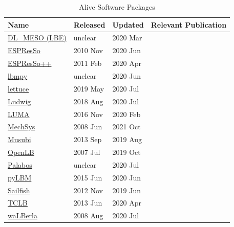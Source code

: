 \documentclass[final, 3p, times, authoryear]{elsarticle}
\begin{document}
\begin{table}
	\begin{center}
		\begin{tabular}{ p{3cm}p{2cm}p{2cm}p{5.5cm} }
			\toprule
			Name & Released & Updated & Relevant Publication\\
			\midrule
			\href{https://www.ccp5.ac.uk/sites/www.ccp5.ac.uk/files/dl_meso/data/dl_meso_2.7.zip}{DL\_MESO (LBE)} & unclear & 2020 Mar&\citep{seaton2013dlmeso}\\
			\href{https://github.com/espressomd/espresso}{ESPResSo} & 2010 Nov & 2020 Jun&\citep{weik2019espresso}\\
			\href{https://github.com/espressopp/espressopp}{ESPResSo++} & 2011 Feb & 2020 Apr&\citep{halverson2013espresso++}\\
			\href{https://github.com/mabau/lbmpy}{lbmpy}& unclear  & 2020 Jun & \citep{bauer2021lbmpy}\\
			\href{https://github.com/Olllom/lettuce}{lettuce} & 2019 May & 2020 Jul&\citep{bedrunka2021lettuce}\\
			\href{https://github.com/ludwig-cf/ludwig}{Ludwig} & 2018 Aug & 2020 Jul&\citep{desplat2001ludwig}\\
			\href{https://github.com/aharwood2/LUMA}{LUMA} & 2016 Nov   & 2020 Feb &\citep{harwood2018luma}\\
			\href{http://hg.savannah.gnu.org/hgweb/mechsys/file/tip/}{MechSys} & 2008 Jun    & 2021 Oct &\citep{galindo2013coupled}\\
			\href{https://osdn.net/projects/apes/scm/hg/musubi/}{Musubi} & 2013 Sep & 2019 Aug &\citep{hasert2014complex}\\
			\href{https://www.openlb.net/download/}{OpenLB} & 2007 Jul & 2019 Oct &\citep{heuveline2010openlb}\\
			\href{https://gitlab.com/unigespc/palabos}{Palabos} & unclear & 2020 Jul &\citep{latt2021palabos}\\
			\href{https://github.com/pylbm/pylbm}{pyLBM} & 2015 Jun&   2020 Jun &\\
			\href{https://github.com/sailfish-team/sailfish}{Sailfish} & 2012 Nov & 2019 Jun & \citep{januszewski2014sailfish}\\
			\href{https://github.com/CFD-GO/TCLB}{TCLB} & 2013 Jun  & 2020 Apr & \citep{rokicki2016adjoint}\\
			\href{https://i10git.cs.fau.de/walberla/walberla}{waLBerla} & 2008 Aug & 2020 Jul & \citep{bauer2021walberla}\\
			\bottomrule
		\end{tabular}
		\caption{Alive Software Packages} \label{alivepackages}
	\end{center}
\end{table}
\end{document}

